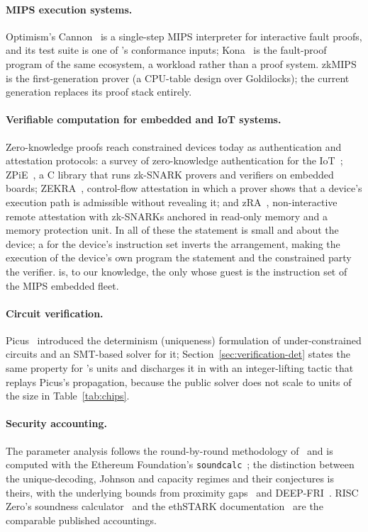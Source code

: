 \paragraph{MIPS execution systems.} Optimism's Cannon~\citep{cannon} is a single-step MIPS interpreter for interactive fault proofs, and its test suite is one of \Ziren{}'s conformance inputs; Kona~\citep{kona} is the fault-proof program of the same ecosystem, a workload rather than a proof system. zkMIPS~\citep{zkmips} is the first-generation \Ziren{} prover (a CPU-table design over Goldilocks); the current generation replaces its proof stack entirely.

\paragraph{Verifiable computation for embedded and IoT systems.} Zero-knowledge proofs reach constrained devices today as authentication and attestation protocols: a survey of zero-knowledge authentication for the IoT~\citep{zk-iot-survey}; ZPiE~\citep{zpie}, a C library that runs zk-SNARK provers and verifiers on embedded boards; ZEKRA~\citep{zekra}, control-flow attestation in which a prover shows that a device's execution path is admissible without revealing it; and zRA~\citep{zra}, non-interactive remote attestation with zk-SNARKs anchored in read-only memory and a memory protection unit. In all of these the statement is small and about the device; a \zkVM{} for the device's instruction set inverts the arrangement, making the execution of the device's own program the statement and the constrained party the verifier. \Ziren{} is, to our knowledge, the only \zkVM{} whose guest is the instruction set of the MIPS embedded fleet.

\paragraph{Circuit verification.} Picus~\citep{picus} introduced the determinism (uniqueness) formulation of under-constrained circuits and an SMT-based solver for it; Section~\ref{sec:verification-det} states the same property for \Ziren{}'s units and discharges it in \Lean{} with an integer-lifting tactic that replays Picus's propagation, because the public solver does not scale to units of the size in Table~\ref{tab:chips}.

\paragraph{Security accounting.} The parameter analysis follows the round-by-round methodology of~\citep{whir} and is computed with the Ethereum Foundation's \texttt{soundcalc}~\citep{soundcalc}; the distinction between the unique-decoding, Johnson and capacity regimes and their conjectures is theirs, with the underlying bounds from proximity gaps~\citep{proximity-gaps} and DEEP-FRI~\citep{deep-fri}. RISC Zero's soundness calculator~\citep{risc0-soundness} and the ethSTARK documentation~\citep{ethstark} are the comparable published accountings.
